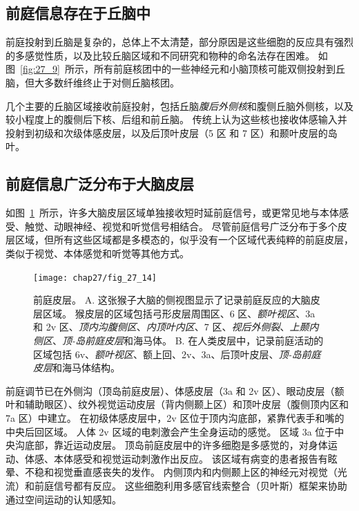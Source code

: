 \subsection{前庭信息存在于丘脑中}

前庭投射到丘脑是复杂的，总体上不太清楚，部分原因是这些细胞的反应具有强烈的多感觉性质，以及比较丘脑区域和不同研究和物种的命名法存在困难。
如图~\ref{fig:27_9}~所示，所有前庭核团中的一些神经元和小脑顶核可能双侧投射到丘脑，但大多数纤维终止于对侧丘脑核团。


几个主要的丘脑区域接收前庭投射，包括丘脑\textit{腹后外侧核}和腹侧丘脑外侧核，以及较小程度上的腹侧后下核、后组和前丘脑。
传统上认为这些核也接收体感输入并投射到初级和次级体感皮层，以及后顶叶皮层（5 区 和 7 区）和颞叶皮层的岛叶。



\subsection{前庭信息广泛分布于大脑皮层}

如图~\ref{fig:27_14}~所示，许多大脑皮层区域单独接收短时延前庭信号，或更常见地与本体感受、触觉、动眼神经、视觉和听觉信号相结合。 
尽管前庭信号广泛分布于多个皮层区域，但所有这些区域都是多模态的，似乎没有一个区域代表纯粹的前庭皮层，类似于视觉、本体感觉和听觉等其他方式。


\begin{figure}[htbp]
	\centering
	\texttt{[image: chap27/fig\_27\_14]}
	\caption{前庭皮层。
		A. 这张猴子大脑的侧视图显示了记录前庭反应的大脑皮层区域。
		猴皮层的区域包括弓形皮层周围区、6 区、\textit{额叶视区}、3a 和 2v 区、\textit{顶内沟腹侧区}、\textit{内顶叶内区}、7 区、\textit{视后外侧裂}、\textit{上颞内侧区}、\textit{顶-岛前庭皮层}和海马体。
		B. 在人类皮层中，记录前庭活动的区域包括 6v、\textit{额叶视区}、额上回、2v、3a、后顶叶皮层、\textit{顶-岛前庭皮层}和海马体结构。}
	\label{fig:27_14}
\end{figure}


前庭调节已在外侧沟（顶岛前庭皮层）、体感皮层（3a 和 2v 区）、眼动皮层（额叶和辅助眼区）、纹外视觉运动皮层（背内侧颞上区）和顶叶皮层（腹侧顶内区和 7a 区）中建立。
在初级体感皮层中，2v 区位于顶内沟底部，紧靠代表手和嘴的中央后回区域。
人体 2v 区域的电刺激会产生全身运动的感觉。
区域 3a 位于中央沟底部，靠近运动皮层。
顶岛前庭皮层中的许多细胞是多感觉的，对身体运动、体感、本体感受和视觉运动刺激作出反应。
该区域有病变的患者报告有眩晕、不稳和视觉垂直感丧失的发作。
内侧顶内和内侧颞上区的神经元对视觉（光流）和前庭信号都有反应。
这些细胞利用多感官线索整合（贝叶斯）框架来协助通过空间运动的认知感知。


